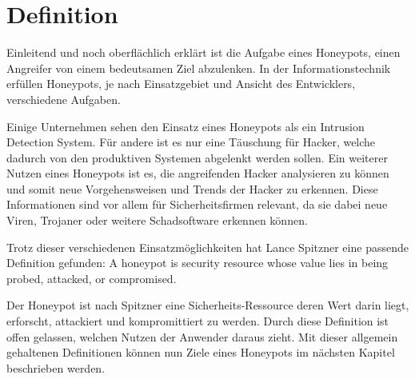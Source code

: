 \section{Definition}

Einleitend und noch oberflächlich erklärt ist die Aufgabe eines Honeypots, einen Angreifer von einem bedeutsamen Ziel abzulenken. In der Informationstechnik erfüllen Honeypots, je nach Einsatzgebiet und Ansicht des Entwicklers, verschiedene Aufgaben.

Einige Unternehmen sehen den Einsatz eines Honeypots als ein Intrusion Detection System. Für andere ist es nur eine Täuschung für Hacker, welche dadurch von den produktiven Systemen abgelenkt werden sollen. Ein weiterer Nutzen eines Honeypots ist es, die angreifenden Hacker analysieren zu können und somit neue Vorgehensweisen und Trends der Hacker zu erkennen. Diese Informationen sind vor allem für Sicherheitsfirmen relevant, da sie dabei neue Viren, Trojaner oder weitere Schadsoftware erkennen können.

Trotz dieser verschiedenen Einsatzmöglichkeiten hat Lance Spitzner eine passende Definition gefunden: \glqq A honeypot is security resource whose value lies in being probed, attacked, or compromised.\grqq \cite{spitzner.2002a}

Der Honeypot ist nach Spitzner eine Sicherheits-Ressource deren Wert darin liegt, erforscht, attackiert und kompromittiert zu werden. Durch diese Definition ist offen gelassen, welchen Nutzen der Anwender daraus zieht. Mit dieser allgemein gehaltenen Definitionen können nun Ziele eines Honeypots im nächsten Kapitel beschrieben werden.
